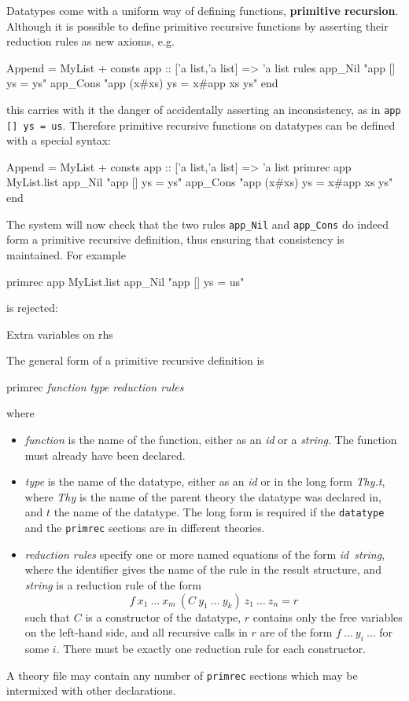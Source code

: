 Datatypes come with a uniform way of defining functions, {\bf primitive
  recursion}. Although it is possible to define primitive recursive functions
by asserting their reduction rules as new axioms, e.g.\
\begin{ttbox}
Append = MyList +
consts app :: ['a list,'a list] => 'a list
rules 
   app_Nil   "app [] ys = ys"
   app_Cons  "app (x#xs) ys = x#app xs ys"
end
\end{ttbox}
this carries with it the danger of accidentally asserting an inconsistency,
as in \verb$app [] ys = us$. Therefore primitive recursive functions on
datatypes can be defined with a special syntax:
\begin{ttbox}
Append = MyList +
consts app :: ['a list,'a list] => 'a list
primrec app MyList.list
   app_Nil   "app [] ys = ys"
   app_Cons  "app (x#xs) ys = x#app xs ys"
end
\end{ttbox}
The system will now check that the two rules \verb$app_Nil$ and
\verb$app_Cons$ do indeed form a primitive recursive definition, thus
ensuring that consistency is maintained. For example
\begin{ttbox}
primrec app MyList.list
    app_Nil   "app [] ys = us"
\end{ttbox}
is rejected:
\begin{ttbox}
Extra variables on rhs
\end{ttbox}
\bigskip

The general form of a primitive recursive definition is
\begin{ttbox}
primrec {\it function} {\it type}
    {\it reduction rules}
\end{ttbox}
where
\begin{itemize}
\item {\it function} is the name of the function, either as an {\it id} or a
  {\it string}. The function must already have been declared.
\item {\it type} is the name of the datatype, either as an {\it id} or in the
  long form {\it Thy.t}, where {\it Thy} is the name of the parent theory the
  datatype was declared in, and $t$ the name of the datatype. The long form
  is required if the {\tt datatype} and the {\tt primrec} sections are in
  different theories.
\item {\it reduction rules} specify one or more named equations of the form
  {\it id\/}~{\it string}, where the identifier gives the name of the rule in
  the result structure, and {\it string} is a reduction rule of the form \[
  f~x_1~\dots~x_m~(C~y_1~\dots~y_k)~z_1~\dots~z_n = r \] such that $C$ is a
  constructor of the datatype, $r$ contains only the free variables on the
  left-hand side, and all recursive calls in $r$ are of the form
  $f~\dots~y_i~\dots$ for some $i$. There must be exactly one reduction
  rule for each constructor.
\end{itemize}
A theory file may contain any number of {\tt primrec} sections which may be
intermixed with other declarations.

